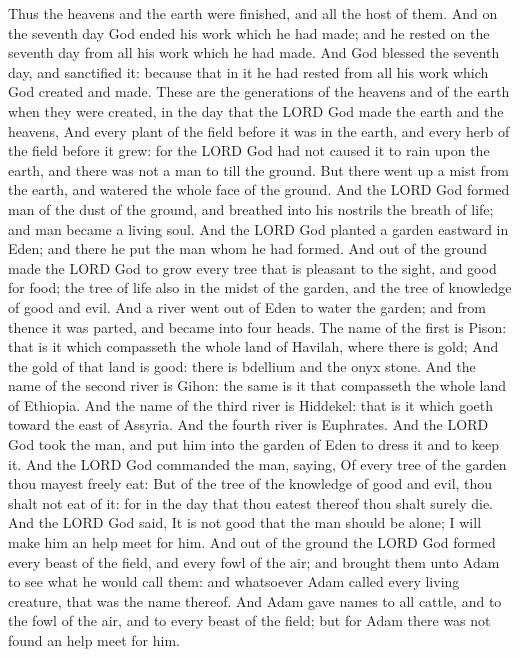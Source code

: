 \begin{biblechapter} %
\verse Thus the heavens and the earth were finished, and all the host of them.
\verse And on the seventh day God ended his work which he had made; and he rested on the seventh day from all his work which he had made.
\verse And God blessed the seventh day, and sanctified it: because that in it he had rested from all his work which God created and made.
\verse These are the generations of the heavens and of the earth when they were created, in the day that the LORD God made the earth and the heavens,
\verse And every plant of the field before it was in the earth, and every herb of the field before it grew: for the LORD God had not caused it to rain upon the earth, and there was not a man to till the ground.
\verse But there went up a mist from the earth, and watered the whole face of the ground.
\verse And the LORD God formed man of the dust of the ground, and breathed into his nostrils the breath of life; and man became a living soul.
\verse And the LORD God planted a garden eastward in Eden; and there he put the man whom he had formed.
\verse And out of the ground made the LORD God to grow every tree that is pleasant to the sight, and good for food; the tree of life also in the midst of the garden, and the tree of knowledge of good and evil.
\verse And a river went out of Eden to water the garden; and from thence it was parted, and became into four heads.
\verse The name of the first is Pison: that is it which compasseth the whole land of Havilah, where there is gold;
\verse And the gold of that land is good: there is bdellium and the onyx stone.
\verse And the name of the second river is Gihon: the same is it that compasseth the whole land of Ethiopia.
\verse And the name of the third river is Hiddekel: that is it which goeth toward the east of Assyria. And the fourth river is Euphrates.
\verse And the LORD God took the man, and put him into the garden of Eden to dress it and to keep it.
\verse And the LORD God commanded the man, saying, Of every tree of the garden thou mayest freely eat:
\verse But of the tree of the knowledge of good and evil, thou shalt not eat of it: for in the day that thou eatest thereof thou shalt surely die.
\verse And the LORD God said, It is not good that the man should be alone; I will make him an help meet for him.
\verse And out of the ground the LORD God formed every beast of the field, and every fowl of the air; and brought them unto Adam to see what he would call them: and whatsoever Adam called every living creature, that was the name thereof.
\verse And Adam gave names to all cattle, and to the fowl of the air, and to every beast of the field; but for Adam there was not found an help meet for him.

\end{biblechapter}
